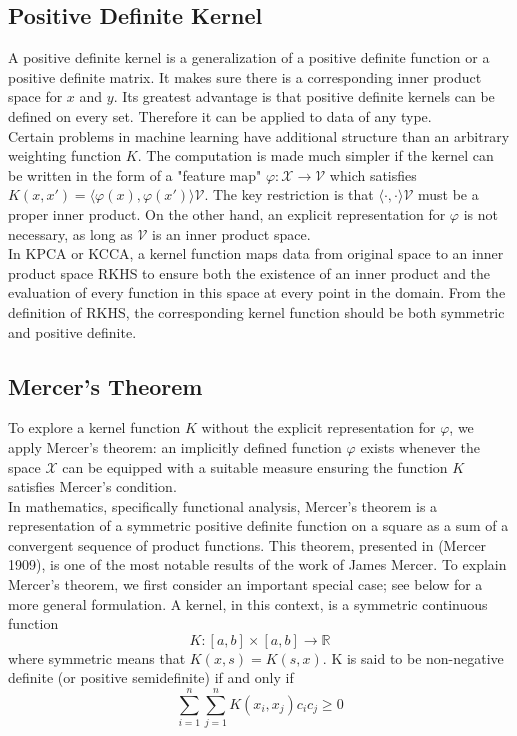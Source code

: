 \documentclass[12pt]{report} %
\begin{document}
\subsection{Positive Definite Kernel}
A positive definite kernel is a generalization of a positive definite function or a positive definite matrix. It makes sure there is a corresponding inner product space for $x$ and $y$. Its greatest advantage is that positive definite kernels can be defined on every set. Therefore it can be applied to data of any type.\\
Certain problems in machine learning have additional structure than an arbitrary weighting function $K$. The computation is made much simpler if the kernel can be written in the form of a "feature map" $\varphi:\mathcal{X}\to\mathcal{V}$ which satisfies $K(x,x')=\langle \varphi (x), \varphi (x') \rangle \mathcal{V}$. The key restriction is that $\langle \cdot, \cdot \rangle \mathcal{V}$ must be a proper inner product. On the other hand, an explicit representation for $\varphi$ is not necessary, as long as $\mathcal{V}$ is an inner product space\cite{PD}.\\
In KPCA or KCCA, a kernel function maps data from original space to an inner product space RKHS to ensure both the existence of an inner product and the evaluation of every function in this space at every point in the domain. From the definition of RKHS, the corresponding kernel function should be both symmetric and positive definite\cite{RKHS}.

\subsection{Mercer's Theorem}
To explore a kernel function $K$ without the explicit representation for $\varphi$, we apply Mercer's theorem: an implicitly defined function $\varphi$ exists whenever the space $\mathcal {X}$ can be equipped with a suitable measure ensuring the function $K$ satisfies Mercer's condition.\\
In mathematics, specifically functional analysis, Mercer's theorem is a representation of a symmetric positive definite function on a square as a sum of a convergent sequence of product functions. This theorem, presented in (Mercer 1909), is one of the most notable results of the work of James Mercer\cite{MT}.
To explain Mercer's theorem, we first consider an important special case; see below for a more general formulation. A kernel, in this context, is a symmetric continuous function
\begin{equation}
K:[a,b] \times [a,b] \rightarrow \mathbb {R}
\end{equation}
where symmetric means that \( K(x, s) = K(s, x)\).
K is said to be non-negative definite (or positive semidefinite) if and only if
\begin{equation}
\sum _{i=1}^{n}\sum _{j=1}^{n}K(x_{i},x_{j})c_{i}c_{j}\geq 0
\end{equation}
\end{document}
